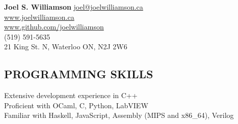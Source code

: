 \documentclass{res}
\begin{document}
 

\begin{center}
{\Large\bf Joel S. Williamson}
{\center \href{mailto:joel@joelwilliamson.ca}{joel@joelwilliamson.ca}\\\url{www.joelwilliamson.ca}\\\url{www.github.com/joelwilliamson}\\
(519) 591-5635\\21 King St. N, Waterloo ON, N2J 2W6 }
\end{center}
\vspace{-1cm}                 
\begin{resume}

\section{PROGRAMMING SKILLS}          
  \vspace{3mm}
    Extensive development experience in C++\\
    Proficient with OCaml, C, Python, LabVIEW\\
    Familiar with Haskell, JavaScript, Assembly (MIPS and x86\_64), Verilog 
 

 

\end{resume}
\end{document}
